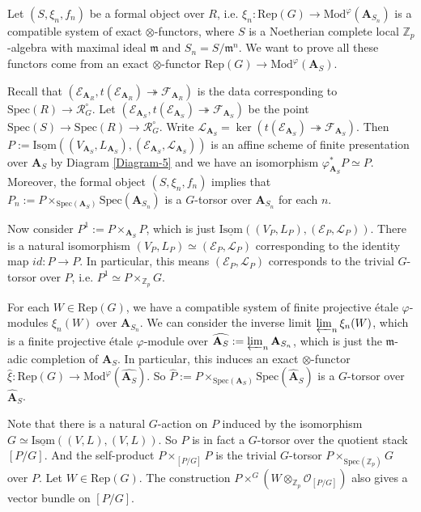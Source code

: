 \documentclass[10pt]{article}
\numberwithin{equation}{section}
\newcommand{\frakm}{{\mathfrak m}}
\newcommand{\bZ}{{\mathbb Z}}
\newcommand{\calE}{{\mathcal E}}
\newcommand{\calF}{{\mathcal F}}
\newcommand{\calL}{{\mathcal L}}
\newcommand{\calO}{{\mathcal O}}
\newcommand{\calR}{{\mathcal R}}
\newcommand{\Isom}{{\mathrm{Isom}}}         %
\newcommand{\Mod}{{\mathrm{Mod}}}           %
\newcommand{\Rep}{{\mathrm{Rep}}}           %
\newcommand{\Spec}{{\mathrm{Spec}}}         %
\newcommand{\bfA}{{\textbf{A}}}
\begin{document}
Let $(S,\xi_n,f_n)$ be a formal object over $R$, i.e. $\xi_n:\Rep(G)\to \Mod^{\varphi}(\bfA_{S_n})$ is a compatible system of exact $\otimes$-functors, where $S$ is a Noetherian complete local $\bZ_p$-algebra with maximal ideal $\frakm$ and $S_n=S/\frakm^n$. We want to prove all these functors come from an exact $\otimes$-functor $\Rep(G)\to \Mod^{\varphi}(\bfA_{S})$.


Recall that $(\calE_{\bfA_R}, t(\calE_{\bfA_R})\twoheadrightarrow \calF_{\bfA_R})$ is the data corresponding to $\Spec(R)\to \calR^{\circ}_G$. Let $(\calE_{\bfA_S}, t(\calE_{\bfA_S})\twoheadrightarrow \calF_{\bfA_S})$ be the point $\Spec(S)\to \Spec(R)\to \calR^{\circ}_G$. Write $\calL_{\bfA_S}=\ker(t(\calE_{\bfA_S})\twoheadrightarrow \calF_{\bfA_S})$.  Then $P:=\underline{\Isom}((V_{\bfA_S},L_{\bfA_S}),(\calE_{\bfA_S},\calL_{\bfA_S}))$ is an affine scheme of finite presentation over $\bfA_S$ by Diagram \ref{Diagram-5} and we have an isomorphism $\varphi^*_{\bfA_S}P\simeq P$. Moreover, the formal object $(S,\xi_n,f_n)$ implies  that $P_n:=P\times_{\Spec(\bfA_S)}\Spec(\bfA_{S_n})$ is a $G$-torsor over $\bfA_{S_n}$ for each $n$. 

Now consider $P^1:=P\times_{\bfA_S}P$, which is just $\underline{\Isom}((V_P,L_P),(\calE_P,\calL_P))$. There is a natural isomorphism $(V_P,L_P)\simeq (\calE_P,\calL_P)$ corresponding to the identity map $id: P\to P$. In particular, this means $(\calE_P,\calL_P)$ corresponds to the trivial $G$-torsor over $P$, i.e. $P^1\simeq P\times_{\bZ_p}G$.

For each $W\in \Rep(G)$, we have a compatible system of finite projective \'etale $\varphi$-modules $\xi_n(W)$ over $\bfA_{S_n}$. We can consider the inverse limit $\varprojlim_n\xi_n(W)$, which is a finite projective \'etale $\varphi$-module over $\widehat {\bfA_S}:=\varprojlim_n \bfA_{S_n}$, which is just the $\frakm$-adic completion of $\bfA_S$. In particular, this induces an exact $\otimes$-functor $\hat \xi:\Rep(G)\to \Mod^{\varphi}(\widehat{\bfA_S})$.  So $\widehat P:=P\times_{\Spec(\bfA_S)}\Spec(\widehat\bfA_S)$ is a $G$-torsor over $\widehat \bfA_S$.

Note that there is a natural $G$-action on $P$ induced by the isomorphism $G\simeq \underline{\Isom}((V,L),(V,L))$. So $P$ is in fact a $G$-torsor over the quotient stack $[P/G]$. And the self-product $P\times_{[P/G]}P$ is the trivial $G$-torsor $P\times_{\Spec(\bZ_p)}G$ over $P$. Let $W\in \Rep(G)$. The construction $P\times^G(W\otimes_{\bZ_p}\calO_{[P/G]})$ also gives a vector bundle on $[P/G]$.
\end{document}
